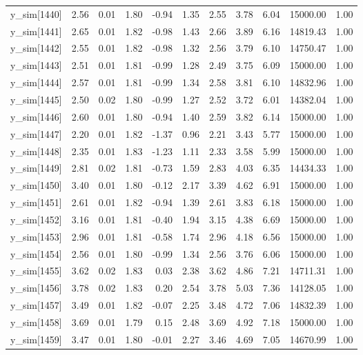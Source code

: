 \begin{table}[ht]
\begin{tabular}{rrrrrrrrrrr}
  y\_sim[1440] & 2.56 & 0.01 & 1.80 & -0.94 & 1.35 & 2.55 & 3.78 & 6.04 & 15000.00 & 1.00 \\ 
  y\_sim[1441] & 2.65 & 0.01 & 1.82 & -0.98 & 1.43 & 2.66 & 3.89 & 6.16 & 14819.43 & 1.00 \\ 
  y\_sim[1442] & 2.55 & 0.01 & 1.82 & -0.98 & 1.32 & 2.56 & 3.79 & 6.10 & 14750.47 & 1.00 \\ 
  y\_sim[1443] & 2.51 & 0.01 & 1.81 & -0.99 & 1.28 & 2.49 & 3.75 & 6.09 & 15000.00 & 1.00 \\ 
  y\_sim[1444] & 2.57 & 0.01 & 1.81 & -0.99 & 1.34 & 2.58 & 3.81 & 6.10 & 14832.96 & 1.00 \\ 
  y\_sim[1445] & 2.50 & 0.02 & 1.80 & -0.99 & 1.27 & 2.52 & 3.72 & 6.01 & 14382.04 & 1.00 \\ 
  y\_sim[1446] & 2.60 & 0.01 & 1.80 & -0.94 & 1.40 & 2.59 & 3.82 & 6.14 & 15000.00 & 1.00 \\ 
  y\_sim[1447] & 2.20 & 0.01 & 1.82 & -1.37 & 0.96 & 2.21 & 3.43 & 5.77 & 15000.00 & 1.00 \\ 
  y\_sim[1448] & 2.35 & 0.01 & 1.83 & -1.23 & 1.11 & 2.33 & 3.58 & 5.99 & 15000.00 & 1.00 \\ 
  y\_sim[1449] & 2.81 & 0.02 & 1.81 & -0.73 & 1.59 & 2.83 & 4.03 & 6.35 & 14434.33 & 1.00 \\ 
  y\_sim[1450] & 3.40 & 0.01 & 1.80 & -0.12 & 2.17 & 3.39 & 4.62 & 6.91 & 15000.00 & 1.00 \\ 
  y\_sim[1451] & 2.61 & 0.01 & 1.82 & -0.94 & 1.39 & 2.61 & 3.83 & 6.18 & 15000.00 & 1.00 \\ 
  y\_sim[1452] & 3.16 & 0.01 & 1.81 & -0.40 & 1.94 & 3.15 & 4.38 & 6.69 & 15000.00 & 1.00 \\ 
  y\_sim[1453] & 2.96 & 0.01 & 1.81 & -0.58 & 1.74 & 2.96 & 4.18 & 6.56 & 15000.00 & 1.00 \\ 
  y\_sim[1454] & 2.56 & 0.01 & 1.80 & -0.99 & 1.34 & 2.56 & 3.76 & 6.06 & 15000.00 & 1.00 \\ 
  y\_sim[1455] & 3.62 & 0.02 & 1.83 & 0.03 & 2.38 & 3.62 & 4.86 & 7.21 & 14711.31 & 1.00 \\ 
  y\_sim[1456] & 3.78 & 0.02 & 1.83 & 0.20 & 2.54 & 3.78 & 5.03 & 7.36 & 14128.05 & 1.00 \\ 
  y\_sim[1457] & 3.49 & 0.01 & 1.82 & -0.07 & 2.25 & 3.48 & 4.72 & 7.06 & 14832.39 & 1.00 \\ 
  y\_sim[1458] & 3.69 & 0.01 & 1.79 & 0.15 & 2.48 & 3.69 & 4.92 & 7.18 & 15000.00 & 1.00 \\ 
  y\_sim[1459] & 3.47 & 0.01 & 1.80 & -0.01 & 2.27 & 3.46 & 4.69 & 7.05 & 14670.99 & 1.00 \\ 

\end{tabular}
\end{table}
